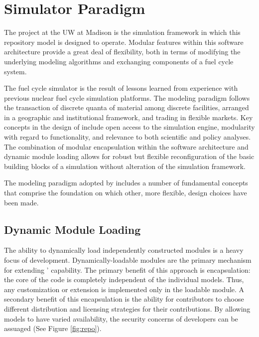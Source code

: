 \section{\Cyclus Simulator Paradigm }

The \Cyclus project at the \gls{UW} at Madison is the 
simulation framework in which this repository model is designed to 
operate.  Modular features within this software architecture provide a 
great deal of flexibility, both in terms of modifying the underlying 
modeling algorithms and exchanging components of a fuel cycle system.

The \Cyclus fuel cycle simulator is the  result of lessons learned 
from experience with previous nuclear fuel cycle simulation platforms.  
The modeling paradigm follows the transaction of discrete quanta of 
material among discrete facilities, arranged in a geographic and 
institutional framework, and trading in
flexible markets. Key concepts in the design of \Cyclus include open
access to the simulation engine, modularity with regard to
functionality, and relevance to both scientific and policy
analyses. The combination of modular encapsulation within the
software architecture and dynamic module loading allows for robust but 
flexible reconfiguration of the basic building blocks of a simulation 
without alteration of the simulation framework.  

The modeling paradigm adopted by \Cyclus includes a number of
fundamental concepts that comprise the foundation on which other, more
flexible, design choices have been made. 

\subsection{Dynamic Module Loading}

The ability to dynamically load independently constructed modules is a
heavy focus of \Cyclus development. Dynamically-loadable modules are
the primary mechanism for extending \Cyclus' capability. The primary
benefit of this approach is encapsulation: the core of the code is
completely independent of the individual models. Thus, any
customization or extension is implemented only in the loadable
module. A secondary benefit of this encapsulation is the ability for
contributors to choose different distribution and licensing strategies
for their contributions. By allowing models to have varied
availability, the security concerns of developers can be
assuaged (See Figure \ref{fig:repo}). 

